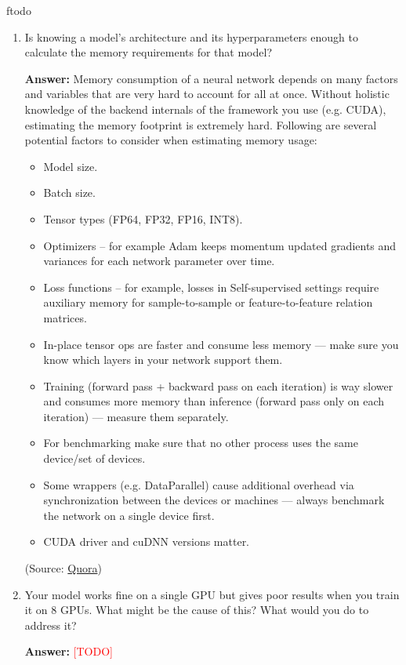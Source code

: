 ƒtodo\documentclass{article}
\newenvironment{QandA}{\begin{enumerate}[label=\arabic*.]}{\end{enumerate}}
\newenvironment{answer}{\par\normalfont \textbf{Answer:}}{}
\newcommand{\todo}{\textcolor{red}{[TODO]}}
\begin{document}
\begin{QandA}
    \item Is knowing a model’s architecture and its hyperparameters enough to calculate the memory requirements for that model?
    \begin{answer}
        Memory consumption of a neural network depends on many factors and variables that are very hard to account for all at once. Without holistic knowledge of the backend internals of the framework you use (e.g. CUDA), estimating the memory footprint is extremely hard.
        Following are several potential factors to consider when estimating memory usage:
        \begin{itemize}
            \item Model size.
            \item Batch size.
            \item Tensor types (FP64, FP32, FP16, INT8).
            \item Optimizers -- for example Adam keeps momentum updated gradients and variances for each network parameter over time.
            \item Loss functions -- for example, losses in Self-supervised settings require auxiliary memory for sample-to-sample or feature-to-feature relation matrices.
            \item In-place tensor ops are faster and consume less memory — make sure you know which layers in your network support them. 
            \item Training (forward pass + backward pass on each iteration) is way slower and consumes more memory than inference (forward pass only on each iteration) — measure them separately.
            \item For benchmarking make sure that no other process uses the same device/set of devices.
            \item Some wrappers (e.g. DataParallel) cause additional overhead via synchronization between the devices or machines — always benchmark the network on a single device first.
            \item CUDA driver and cuDNN versions matter.
        \end{itemize}

        (Source: \href{https://qr.ae/pve5Jd}{Quora})
    \end{answer}

    \item Your model works fine on a single GPU but gives poor results when you train it on 8 GPUs. What might be the cause of this? What would you do to address it?
    \begin{answer}
        \todo
    \end{answer}


\end{QandA}
\end{document}
